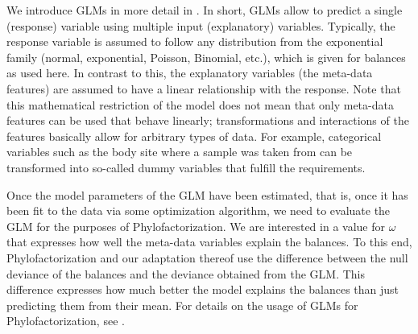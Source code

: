We introduce \acp{GLM} in more detail in .
In short, \acp{GLM} allow to predict a single (response) variable using multiple input (explanatory) variables.
Typically, the response variable is assumed to follow any distribution from the exponential family
(normal, exponential, Poisson, Binomial, etc.), which is given for balances as used here.
In contrast to this, the explanatory variables (the meta-data features)
are assumed to have a linear relationship with the response.
Note that this mathematical restriction of the model does not mean
that only meta-data features can be used that behave linearly;
transformations and interactions of the features basically allow for arbitrary types of data.
For example, categorical variables such as the body site where a sample was taken from can be transformed
into so-called dummy variables that fulfill the requirements.

Once the model parameters of the \ac{GLM} have been estimated,
that is, once it has been fit to the data via some optimization algorithm,
we need to evaluate the \ac{GLM} for the purposes of Phylofactorization.
We are interested in a value for $\omega$ that expresses how well the meta-data variables explain the balances.
To this end, Phylofactorization and our adaptation thereof use the difference between the null deviance of the balances
and the deviance obtained from the \ac{GLM}.
This difference %
expresses how much better the model explains the balances than just predicting them from their mean.
For details on the usage of \acp{GLM} for Phylofactorization, see \cite{Washburne2017a}.



